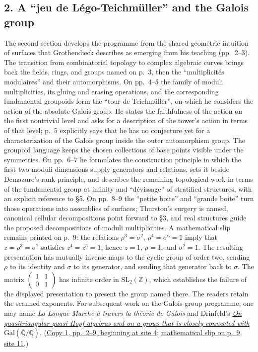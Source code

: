 \subsection*{2. A ``jeu de Légo-Teichmüller'' and the Galois group}
The second section develops the programme from the shared geometric
intuition of surfaces that Grothendieck describes as emerging from his
teaching (pp.~2--3). The transition from combinatorial topology to complex
algebraic curves brings back the fields, rings, and groups named on p.~3,
then the ``multiplicités modulaires'' and their automorphisms. On
pp.~4--5 the family of moduli multiplicities, its gluing and erasing
operations, and the corresponding fundamental groupoids form the
``tour de Teichmüller'', on which he considers the action of the absolute
Galois group. He states the faithfulness of the action on the first
nontrivial level and asks for a description of the tower's action in terms
of that level; p.~5 explicitly says that he has no conjecture yet for a
characterization of the Galois group inside the outer automorphism group.
The groupoid language keeps the chosen collections of base points visible
under the symmetries. On pp.~6--7 he formulates the construction principle
in which the first two moduli dimensions supply generators and relations,
sets it beside Demazure's rank principle, and describes the remaining
topological work in terms of the fundamental group at infinity and
``dévissage'' of stratified structures, with an explicit reference to
\S5. On pp.~8--9 the ``petite boite'' and ``grande boite'' turn those
operations into assemblies of surfaces; Thurston's surgery is named,
canonical cellular decompositions point forward to \S3, and real
structures guide the proposed decompositions of moduli multiplicities.
A mathematical slip remains printed on p.~9: the relations
$\rho^3=\sigma^2$, $\rho^4=\sigma^6=1$ imply that
$z=\rho^3=\sigma^2$ satisfies $z^4=z^3=1$, hence $z=1$,
$\rho=1$, and $\sigma^2=1$. The resulting presentation has mutually
inverse maps to the cyclic group of order two, sending $\rho$ to its
identity and $\sigma$ to its generator, and sending that generator back
to $\sigma$. The matrix $\left(\begin{smallmatrix}1&1\\0&1\end{smallmatrix}\right)$
has infinite order in $\mathrm{SL}_2(\mathbb Z)$, which establishes the
failure of the displayed presentation to present the group named there.
The readers retain the scanned exponents. For subsequent work on the
Galois-group programme, one may name \emph{La Longue Marche à travers la
théorie de Galois} and Drinfeld's
\href{https://www.mathnet.ru/eng/aa199}{\emph{On quasitriangular quasi-Hopf algebras and on a group that is closely connected with}
$\mathrm{Gal}(\overline{\mathbb Q}/\mathbb Q)$}.
(\href{https://grothendieck.umontpellier.fr/web/viewer.html?file=../119.pdf\#page=5}{Copy 1, pp.~2--9, beginning at site 4};
\href{https://grothendieck.umontpellier.fr/web/viewer.html?file=../119.pdf\#page=12}{mathematical slip on p.~9, site 11}.)

